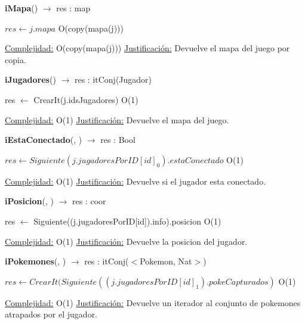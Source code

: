 \begin{algorithm}[H]{\textbf{iMapa}() $\to$ res : map} 
	{}
	\begin{algorithmic}
		\State $res \gets j.mapa $ \Comment O(copy(mapa(j)))
	
		\medskip
		\Statex \underline{Complejidad:} O(copy(mapa(j)))
		\Statex \underline{Justificación:} Devuelve el mapa del juego por copia.
    \end{algorithmic}
\end{algorithm}

\begin{algorithm}[H]{\textbf{iJugadores}() $\to$ res : itConj(Jugador)} 
	{}
	\begin{algorithmic}
		\State res $\gets$ CrearIt(j.idsJugadores)	\Comment O(1)
	
		\medskip
		\Statex \underline{Complejidad:} O(1)
		\Statex \underline{Justificación:} Devuelve el mapa del juego.
    \end{algorithmic}
\end{algorithm}

\begin{algorithm}[H]{\textbf{iEstaConectado}(, ) $\to$ res : Bool} 
	{}
	\begin{algorithmic}
		\State $res \gets Siguiente(j.jugadoresPorID[id]_0).estaConectado $ \Comment O(1)
	
		\medskip
		\Statex \underline{Complejidad:} O(1)
		\Statex \underline{Justificación:} Devuelve si el jugador esta conectado.
    \end{algorithmic}
\end{algorithm}

\begin{algorithm}[H]{\textbf{iPosicion}(, ) $\to$ res : coor} 
	{}
	\begin{algorithmic}
		\State res $\gets$ Siguiente((j.jugadoresPorID[id]).info).posicion  \Comment O(1)
	
		\medskip
		\Statex \underline{Complejidad:} O(1)
		\Statex \underline{Justificación:} Devuelve la posicion del jugador.
    \end{algorithmic}
\end{algorithm}

\begin{algorithm}[H]{\textbf{iPokemones}(, ) $\to$ res : itConj($<$Pokemon, Nat$>$)} 
	{}
	\begin{algorithmic}
		\State $res \gets CrearIt(Siguiente((j.jugadoresPorID[id]_1).pokeCapturados) $ \Comment O(1)
	
		\medskip
		\Statex \underline{Complejidad:} O(1)
		\Statex \underline{Justificación:} Devuelve un iterador al conjunto de pokemones atrapados por el jugador.
    \end{algorithmic}
\end{algorithm}

